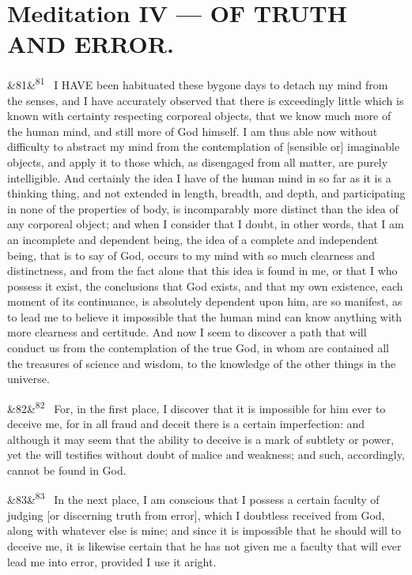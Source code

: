 \documentclass[12pt]{article}
\newcommand{\para}[1][]{\par\noindent\ifx&#1&\else\textsuperscript{\footnotesize #1}~\fi}
\begin{document}
\section*{Meditation IV --- OF TRUTH AND ERROR.}

\para[81] I HAVE been habituated these bygone days to detach my mind from the senses, and I have accurately observed that there is exceedingly little which is known with certainty respecting corporeal objects, that we know much more of the human mind, and still more of God himself. I am thus able now without difficulty to abstract my mind from the contemplation of [sensible or] imaginable objects, and apply it to those which, as disengaged from all matter, are purely intelligible. And certainly the idea I have of the human mind in so far as it is a thinking thing, and not extended in length, breadth, and depth, and participating in none of the properties of body, is incomparably more distinct than the idea of any corporeal object; and when I consider that I doubt, in other words, that I am an incomplete and dependent being, the idea of a complete and independent being, that is to say of God, occurs to my mind with so much clearness and distinctness, and from the fact alone that this idea is found in me, or that I who possess it exist, the conclusions that God exists, and that my own existence, each moment of its continuance, is absolutely dependent upon him, are so manifest, as to lead me to believe it impossible that the human mind can know anything with more clearness and certitude. And now I seem to discover a path that will conduct us from the contemplation of the true God, in whom are contained all the treasures of science and wisdom, to the knowledge of the other things in the universe.

\para[82] For, in the first place, I discover that it is impossible for him ever to deceive me, for in all fraud and deceit there is a certain imperfection: and although it may seem that the ability to deceive is a mark of subtlety or power, yet the will testifies without doubt of malice and weakness; and such, accordingly, cannot be found in God.

\para[83] In the next place, I am conscious that I possess a certain faculty of judging [or discerning truth from error], which I doubtless received from God, along with whatever else is mine; and since it is impossible that he should will to deceive me, it is likewise certain that he has not given me a faculty that will ever lead me into error, provided I use it aright.
\end{document}
